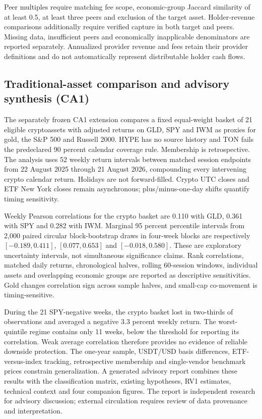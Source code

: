 \documentclass[10pt]{article}
\begin{document}
Peer multiples require matching fee scope, economic-group Jaccard similarity of at least 0.5, at least three peers and exclusion of the target asset. Holder-revenue comparisons additionally require verified capture in both target and peers. Missing data, insufficient peers and economically inapplicable denominators are reported separately. Annualized provider revenue and fees retain their provider definitions and do not automatically represent distributable holder cash flows.

\subsection{Traditional-asset comparison and advisory synthesis (CA1)}
The separately frozen CA1 extension compares a fixed equal-weight basket of 21 eligible cryptoassets with adjusted returns on GLD, SPY and IWM as proxies for gold, the S\&P 500 and Russell 2000. HYPE has no source history and TON fails the predeclared 90 percent calendar coverage rule. Membership is retrospective. The analysis uses 52 weekly return intervals between matched session endpoints from 22 August 2025 through 21 August 2026, compounding every intervening crypto calendar return. Holidays are not forward-filled. Crypto UTC closes and ETF New York closes remain asynchronous; plus/minus-one-day shifts quantify timing sensitivity.

Weekly Pearson correlations for the crypto basket are 0.110 with GLD, 0.361 with SPY and 0.282 with IWM. Marginal 95 percent percentile intervals from 2,000 paired circular block-bootstrap draws in four-week blocks are respectively $[-0.189,0.411]$, $[0.077,0.653]$ and $[-0.018,0.580]$. These are exploratory uncertainty intervals, not simultaneous significance claims. Rank correlations, matched daily returns, chronological halves, rolling 60-session windows, individual assets and overlapping economic groups are reported as descriptive sensitivities. Gold changes correlation sign across sample halves, and small-cap co-movement is timing-sensitive.

During the 21 SPY-negative weeks, the crypto basket lost in two-thirds of observations and averaged a negative 3.3 percent weekly return. The worst-quintile regime contains only 11 weeks, below the threshold for reporting its correlation. Weak average correlation therefore provides no evidence of reliable downside protection. The one-year sample, USDT/USD basis differences, ETF-versus-index tracking, retrospective membership and single-vendor benchmark prices constrain generalization. A generated advisory report combines these results with the classification matrix, existing hypotheses, RV1 estimates, technical context and four companion figures. The report is independent research for advisory discussion; external circulation requires review of data provenance and interpretation.
\end{document}

